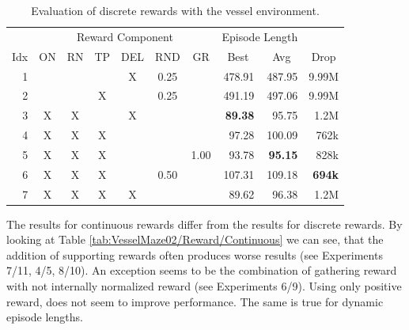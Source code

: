 \begin{table}[htp]
    \begin{center}
        \begin{tabular}{rccccccrrr}
            \toprule
             & \multicolumn{6}{c}{Reward Component} & \multicolumn{2}{c}{Episode Length} & \\
            \cmidrule(lr){2-7}\cmidrule(lr){8-9}
            \multicolumn{1}{c}{Idx} & \multicolumn{1}{c}{ON} & \multicolumn{1}{c}{RN} & \multicolumn{1}{c}{TP} & \multicolumn{1}{c}{DEL} & \multicolumn{1}{c}{RND} & \multicolumn{1}{c}{GR} & \multicolumn{1}{c}{Best} & \multicolumn{1}{c}{Avg} & \multicolumn{1}{c}{Drop}\\
            \midrule
            1 &  &  &  & X & 0.25 &  & 478.91 & 487.95 & 9.99M \\
            2 &  &  & X &  & 0.25 &  & 491.19 & 497.06 & 9.99M \\
            3 & X & X &  & X &  &  & \textbf{89.38} & 95.75 & 1.2M \\
            4 & X & X & X &  &  &  & 97.28 & 100.09 & 762k \\
            5 & X & X & X &  &  & 1.00 & 93.78 & \textbf{95.15} & 828k \\
            6 & X & X & X &  & 0.50 &  & 107.31 & 109.18 & \textbf{694k} \\
            7 & X & X & X & X &  &  & 89.62 & 96.38 & 1.2M \\
            \bottomrule
        \end{tabular}
    \end{center}
    \caption[Evaluation of Discrete Reward Evaluation with the Vessel Environment]{Evaluation of discrete rewards with the vessel environment.} \label{tab:VesselMaze02/Reward/Discrete}
\end{table}


The results for continuous rewards differ from the results for discrete rewards. By looking at Table \ref{tab:VesselMaze02/Reward/Continuous} we can see, that the addition of supporting rewards often produces worse results (see Experiments 7/11, 4/5, 8/10). An exception seems to be the combination of gathering reward with not internally normalized reward (see Experiments 6/9). Using only positive reward, does not seem to improve performance. The same is true for dynamic episode lengths.  


